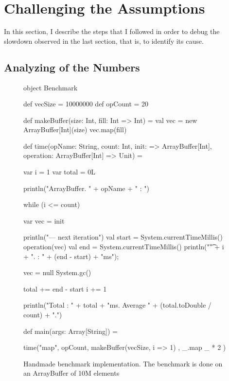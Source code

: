 
\section{Challenging the Assumptions}

In this section, I describe the steps that I followed in order to debug the slowdown observed in the last section, that is, to identify its cause.

\subsection{Analyzing of the Numbers}

\begin{figure}
\begin{lstlisting-nobreak}
object Benchmark {

  def vecSize = 10000000
  def opCount = 20

  def makeBuffer(size: Int, fill: Int => Int) = {
    val vec = new ArrayBuffer[Int](size)
    vec.map(fill)
  }

  def time(opName: String, count: Int, init: => ArrayBuffer[Int], operation: ArrayBuffer[Int] => Unit) = {
    var i = 1
    var total = 0L

    println("ArrayBuffer. " + opName + " : ")

    while (i <= count) {
      var vec = init

      println("--- next iteration")
      val start = System.currentTimeMillis()
      operation(vec)
      val end = System.currentTimeMillis()
      println("\t" + i + ". : " + (end - start) + "ms");

      vec = null
      System.gc()

      total += end - start
      i += 1
    }

    println("Total : " + total + "ms. Average " + (total.toDouble / count) + ".\n")
  }

  def main(args: Array[String]) = {

    time("map", opCount, {
      makeBuffer(vecSize, i => 1)
    }, {
      _.map { _ * 2 }
    })

  }
}
\end{lstlisting-nobreak}
\caption{Handmade benchmark implementation. The benchmark is done on an ArrayBuffer of 10M elements}
\label{fig:HandMadeBench}
\end{figure}

